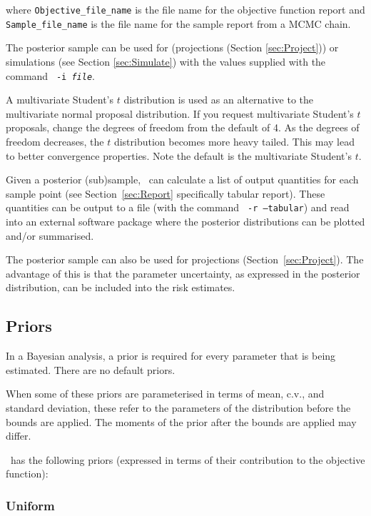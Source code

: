 where \texttt{Objective\_file\_name} is the file name for the objective function report and \texttt{Sample\_file\_name} is the file name for the sample report from a MCMC chain.

The posterior sample can be used for (projections (Section \ref{sec:Project})) or simulations (see Section \ref{sec:Simulate}) with the values supplied with the command \texttt{\cname\ -i \emph{file}}.

A multivariate Student's $t$ distribution is used as an alternative to the multivariate normal proposal distribution. If you request multivariate Student's $t$ proposals, change the degrees of freedom from the default of 4. As the degrees of freedom decreases, the $t$ distribution becomes more heavy tailed. This may lead to better convergence properties. Note the default is the multivariate Student's $t$.

Given a posterior (sub)sample, \CNAME\ can calculate a list of output quantities for each sample point (see Section~\ref{sec:Report} specifically tabular report). These quantities can be output to a file (with the command \texttt{\cname\ -r --tabular}) and read into an external software package where the posterior distributions can be plotted and/or summarised.

The posterior sample can also be used for projections (Section~\ref{sec:Project}). The advantage of this is that the parameter uncertainty, as expressed in the posterior distribution, can be included into the risk estimates.

\subsection{Priors\label{sec:Priors}}

In a Bayesian analysis, a prior is required for every parameter that is being estimated. There are no default priors.

When some of these priors are parameterised in terms of mean, c.v., and standard deviation, these refer to the parameters of the distribution before the bounds are applied. The moments of the prior after the bounds are applied may differ.

\CNAME\ has the following priors (expressed in terms of their contribution to the objective function):


\subsubsection{Uniform}\label{sec:Prior-Uniform}

